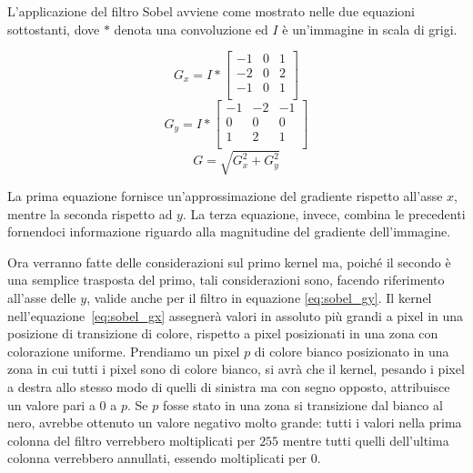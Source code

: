 L'applicazione del filtro Sobel avviene come mostrato nelle due equazioni sottostanti, dove $*$ denota una convoluzione ed $I$ è un'immagine in scala di grigi.

\begin{equation} \label{eq:sobel_gx}
  G_x = 
  I
  *
  \begin{bmatrix}
    -1&0&1\\
    -2&0&2\\
    -1&0&1\\
  \end{bmatrix}
\end{equation}
\begin{equation} \label{eq:sobel_gy}
  G_y = 
  I
  *
  \begin{bmatrix}
    -1&-2&-1\\
    0&0&0\\
    1&2&1\\
  \end{bmatrix}
\end{equation}
\begin{equation} \label{eq:sobel_g}
  G = \sqrt{G_x^2 + G_y^2}
\end{equation}

La prima equazione fornisce un'approssimazione del gradiente rispetto all'asse $x$, mentre la seconda rispetto ad $y$.
La terza equazione, invece, combina le precedenti fornendoci informazione riguardo alla magnitudine del gradiente dell'immagine.


Ora verranno fatte delle considerazioni sul primo kernel ma, poiché il secondo è una semplice trasposta del primo, tali considerazioni sono, facendo riferimento all'asse delle $y$, valide anche per il filtro in equazione \ref{eq:sobel_gy}.
Il kernel nell'equazione~\ref{eq:sobel_gx} assegnerà valori in assoluto più grandi a pixel in una posizione di transizione di colore, rispetto a pixel posizionati in una zona con colorazione uniforme.
Prendiamo un pixel $p$ di colore bianco posizionato in una zona in cui tutti i pixel sono di colore bianco, si avrà che il kernel, pesando i pixel a destra allo stesso modo di quelli di sinistra ma con segno opposto, attribuisce un valore pari a $0$ a $p$.
Se $p$ fosse stato in una zona si transizione dal bianco al nero, avrebbe ottenuto un valore negativo molto grande:
tutti i valori nella prima colonna del filtro verrebbero moltiplicati per $255$ mentre tutti quelli dell'ultima colonna verrebbero annullati, essendo moltiplicati per $0$.


